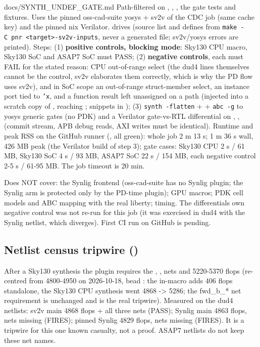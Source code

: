 \begin{relocated}{docs/SYNTH_UNDEF_GATE.md}
Path-filtered on , , ,
the gate tests and fixtures. Uses the pinned oss-cad-suite yosys + sv2v
of the CDC job (same cache key) and the pinned nix Verilator.
 drives 
(source list and defines from
\texttt{make\ -\allowbreak{}C\ pnr\ <target>-\allowbreak{}sv2v-\allowbreak{}inputs},
never a generated file; sv2v/\allowbreak{}yosys errors are printed).
Steps: (1) \textbf{positive controls, blocking mode}: Sky130 CPU macro,
Sky130 SoC and ASAP7 SoC must PASS; (2) \textbf{negative controls}, each
must FAIL for the stated reason: CPU  out-of-range select
(the dud4 lines themselves cannot be the control, sv2v elaborates them
correctly, which is why the PD flow uses sv2v), and in SoC scope an
out-of-range struct-member select, an instance port tied to \texttt{'x},
and a function result left unassigned on a path (injected into a scratch
copy of , reaching ; snippets in
); (3)
\texttt{synth\ -\allowbreak{}flatten} +  +
\texttt{abc\ -\allowbreak{}g} to yosys generic gates (no PDK) and a
Verilator gate-vs-RTL differential on ,
,  (commit stream, APB debug reads,
AXI writes must be identical). Runtime and peak RSS on the GitHub runner
(, all green): whole job 2 m 13 s;  1 m 36 s
wall, 426 MB peak (the Verilator build of step 3); gate cases: Sky130
CPU 2 s / 61 MB, Sky130 SoC 4 s / 93 MB, ASAP7 SoC 22 s / 154 MB, each
negative control 2-5 s / 61-95 MB. The job timeout is 20 min.

Does NOT cover: the Synlig frontend (oss-cad-suite has no Synlig plugin;
the Synlig arm is protected only by the PD-time plugin); GPU macros; PDK
cell models and ABC mapping with the real liberty; timing. The
differential\textquotesingle s own negative control was not re-run for
this job (it was exercised in dud4 with the Synlig netlist, which
diverges). First CI run on GitHub is pending.

\subsection{\texorpdfstring{Netlist census tripwire
()}{Netlist census tripwire ()}}\label{tm:flow:synth-undef-gate:netlist-census-tripwire-toolsverifcheck-cpu-netlist-censuspy}

After a Sky130  synthesis the plugin requires the
, ,  nets and
5220-5370 flops (re-centred from 4800-4950 on 2026-10-18, bead
: the in-macro  adds 406 flops standalone,
the Sky130 CPU synthesis went 4868 -\textgreater{} 5286; the fwd\_b\_*
net requirement is unchanged and is the real tripwire). Measured on the
dud4 netlists: sv2v main 4868 flops + all three nets (PASS); Synlig main
4863 flops, nets missing (FIRES); pinned Synlig 4829 flops, nets missing
(FIRES). It is a tripwire for this one known casualty, not a proof.
ASAP7 netlists do not keep these net names.
\end{relocated}

